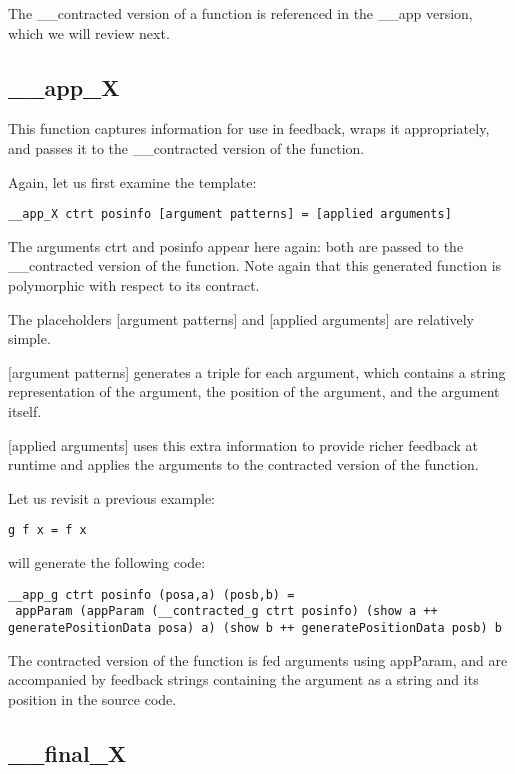 \documentclass[10pt]{report}
\begin{document}
The \_\_contracted version of a function is referenced in the \_\_app version, which we will review next.

\subsection{\_\_app\_X}

This function captures information for use in feedback, wraps it appropriately, and passes it to the \_\_contracted version of the function.

Again, let us first examine the template:

\begin{lstlisting}
__app_X ctrt posinfo [argument patterns] = [applied arguments]
\end{lstlisting}

The arguments ctrt and posinfo appear here again: both are passed to the \_\_contracted version of the function. Note again that this generated function is polymorphic with respect to its contract.

The placeholders [argument patterns] and [applied arguments] are relatively simple.

[argument patterns] generates a triple for each argument, which contains a string representation of the argument, the position of the argument, and the argument itself.

[applied arguments] uses this extra information to provide richer feedback at runtime and applies the arguments to the contracted version of the function.

Let us revisit a previous example:

\begin{lstlisting}
g f x = f x
\end{lstlisting}

will generate the following code:
\begin{lstlisting}
__app_g ctrt posinfo (posa,a) (posb,b) =
 appParam (appParam (__contracted_g ctrt posinfo) (show a ++ generatePositionData posa) a) (show b ++ generatePositionData posb) b
\end{lstlisting}

The contracted version of the function is fed arguments using appParam, and are accompanied by feedback strings containing the argument as a string and its position in the source code.

\subsection{\_\_final\_X}
\end{document}
